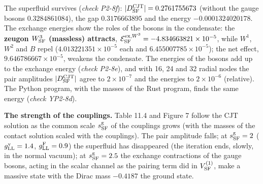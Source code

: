 \documentclass[
  10pt,
]{article}
\begin{document}
The superfluid survives (\emph{check P2-8f}):
\(\lvert D^{\rm CJT}_{\rm SF}\rvert=0.2761755673\) (without the gauge
bosons \(0.3284861084\)), the gap \(0.3176663895\) and the energy
\(-0.0001324020178\). The exchange energies show the roles of the bosons
in the condensate: the \textbf{zeugon \(W^3_{\rm SF}\) (massless)
attracts},
\(\mathcal E^{{\rm ex},W^3}_{\rm SF}=-4.834663821\times10^{-5}\), while
\(W^1\), \(W^2\) and \(B\) repel (\(4.013221351\times10^{-5}\) each and
\(6.455007785\times10^{-5}\)); the net effect,
\(9.646786667\times10^{-5}\), weakens the condensate. The energies of
the bosons add up to the exchange energy (\emph{check P2-8e}), and with
16, 24 and 32 radial nodes the pair amplitudes
\(\lvert D^{\rm CJT}_{\rm SF}\rvert\) agree to \(2\times10^{-7}\) and
the energies to \(2\times10^{-6}\) (relative). The Python program, with
the masses of the Rust program, finds the same energy (\emph{check
YP2-8d}).

\textbf{The strength of the couplings.} Table 11.4 and Figure 7 follow
the CJT solution as the common scale \(s^{\rm g}_{\rm SF}\) of the
couplings grows (with the masses of the contact solution scaled with the
couplings). The pair amplitude falls; at \(s^{\rm g}_{\rm SF}=2\)
(\(g^{\rm v}_{\rm LL}=1.4\), \(g^{\rm F}_{\rm LL}=0.9\)) the superfluid
has disappeared (the iteration ends, slowly, in the normal vacuum); at
\(s^{\rm g}_{\rm SF}=2.5\) the exchange contractions of the gauge
bosons, acting in the scalar channel as the pairing term did in
\(V^{(1)}_{\rm SF}\), make a massive state with the Dirac mass
\(-0.4187\) the ground state.
\end{document}
